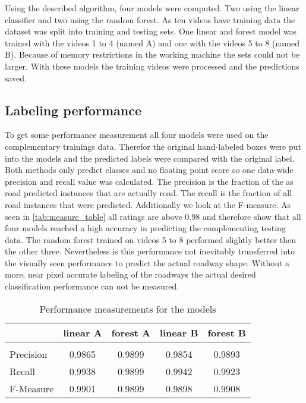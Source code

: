 Using the described algorithm, four models were computed. Two using the linear classifier and two using the random forest. As ten videos have training data the dataset was split into training and testing sets. One linear and forest model was trained with the videos 1 to 4 (named A) and one with the videos 5 to 8 (named B). Because of memory restrictions in the working machine the sets could not be larger. With these models the training videos were processed and the predictions saved.
\subsection{Labeling performance} %
\label{sub:labeling_precision}
To get some performance measurement all four models were used on the complementary trainings data. Therefor the original hand-labeled boxes were put into the models and the predicted labels were compared with the original label. Both methods only predict classes and no floating point score so one data-wide precision and recall value was calculated. The precision is the fraction of the as road predicted instances that are actually road. The recall is the fraction of all road instances that were predicted. Additionally we look at the F-measure.
As seen in \autoref{tab:measure_table} all ratings are above 0.98 and therefore show that all four models reached a high accuracy in predicting  the complementing testing data. The random forest trained on videos 5 to 8 performed slightly better then the other three. Nevertheless is this performance not inevitably transferred into the visually seen performance to predict the actual roadway shape. Without a more, near pixel accurate labeling of the roadways the actual desired classification performance can not be measured.
\begin{table}
	\footnotesize
	\centering
	\begin{tabular}{p{1.7cm}cccc}
	& linear A & forest A & linear B & forest B \\
	\toprule \\
	Precision & 0.9865 & 0.9899 & 0.9854 & 0.9893 \\
	Recall & 0.9938 & 0.9899 & 0.9942 & 0.9923 \\
	F-Measure & 0.9901 & 0.9899 & 0.9898 & 0.9908\\
	\toprule
	\end{tabular}
	\caption{Performance measurements for the models}
	\label{tab:measure_table}
\end{table}

